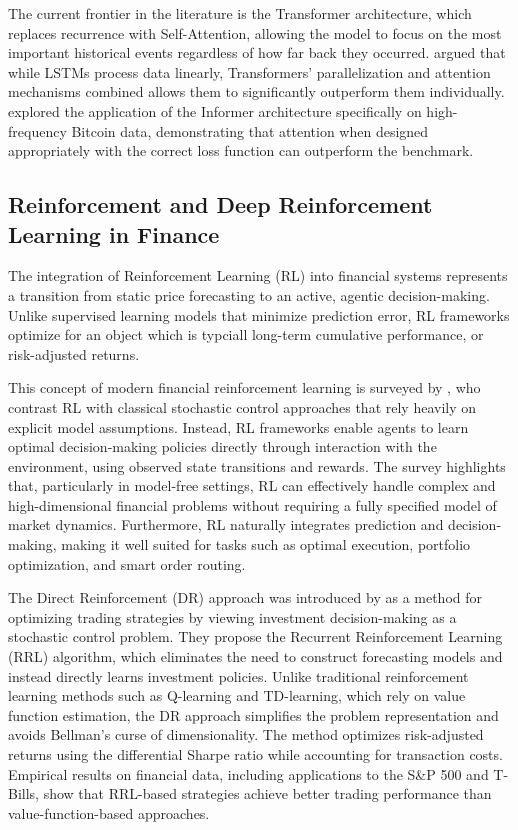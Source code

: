 \documentclass[]{elsarticle}
\begin{document}
The current frontier in the literature is the Transformer architecture, which replaces recurrence with Self-Attention, allowing the model to focus on the most important historical events regardless of how far back they occurred. \citet{Ding2025} argued that while LSTMs process data linearly, Transformers' parallelization and attention mechanisms combined allows them to significantly outperform them individually. \citet{Stefaniuk_Slepaczuk_2025} explored the application of the Informer architecture specifically on high-frequency Bitcoin data, demonstrating that attention when designed appropriately with the correct loss function can outperform the benchmark.

\hypertarget{deep-and-reinforcement-learning-for-trading}{%
\subsection{Reinforcement and Deep Reinforcement Learning in Finance}\label{deep-and-reinforcement-learning-for-trading}}

The integration of Reinforcement Learning (RL) into financial systems represents a transition from static price forecasting to an active, agentic decision-making. Unlike supervised learning models that minimize prediction error, RL frameworks optimize for an object which is typciall long-term cumulative performance, or risk-adjusted returns.

This concept of modern financial reinforcement learning is surveyed by \citet{Hambly_2023}, who contrast RL with classical stochastic control approaches that rely heavily on explicit model assumptions. Instead, RL frameworks enable agents to learn optimal decision-making policies directly through interaction with the environment, using observed state transitions and rewards. The survey highlights that, particularly in model-free settings, RL can effectively handle complex and high-dimensional financial problems without requiring a fully specified model of market dynamics. Furthermore, RL naturally integrates prediction and decision-making, making it well suited for tasks such as optimal execution, portfolio optimization, and smart order routing.

The Direct Reinforcement (DR) approach was introduced by \citet{MOODY} as a method for optimizing trading strategies by viewing investment decision-making as a stochastic control problem. They propose the Recurrent Reinforcement Learning (RRL) algorithm, which eliminates the need to construct forecasting models and instead directly learns investment policies. Unlike traditional reinforcement learning methods such as Q-learning and TD-learning, which rely on value function estimation, the DR approach simplifies the problem representation and avoids Bellman’s curse of dimensionality. The method optimizes risk-adjusted returns using the differential Sharpe ratio while accounting for transaction costs. Empirical results on financial data, including applications to the S\&P 500 and T-Bills, show that RRL-based strategies achieve better trading performance than value-function-based approaches.
\end{document}
